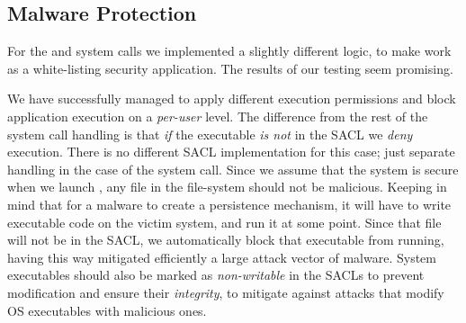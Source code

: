 %
%
%

\subsection{Malware Protection}

\par For the  and  system calls we implemented a slightly different logic, to make  work as a white-listing security application. The results of our testing seem promising. 

\par We have successfully managed to apply different execution permissions and block application execution on a \emph{per-user} level. The difference from the rest of the system call handling is that \emph{if} the executable \emph{is not} in the \ac{SACL} we \emph{deny} execution. There is no different \ac{SACL} implementation for this case; just separate handling in the case of the  system call. Since we assume that the system is secure when we launch , any file in the file-system should not be malicious. Keeping in mind that for a malware to create a persistence mechanism, it will have to write executable code on the victim system, and run it at some point. Since that file will not be in the \ac{SACL}, we automatically block that executable from running, having this way mitigated efficiently a large attack vector of malware. System executables should also be marked as \emph{non-writable} in the \acp{SACL} to prevent modification and ensure their \emph{integrity}, to mitigate against attacks that modify \ac{OS} executables with malicious ones.

